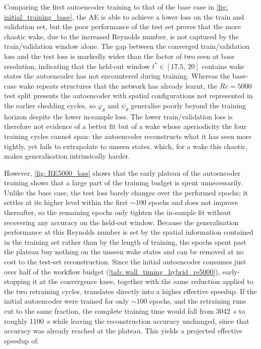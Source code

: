 Comparing the first autoencoder training to that of the base case in \autoref{fig: initial_training_base}, the AE is able to achieve a lower loss on the train and validation set, but the poor performance of the test set proves that the more chaotic wake, due to the increased Reynolds number, is not captured by the train/validation window alone. The gap between the converged train/validation loss and the test loss is markedly wider than the factor of two seen at base resolution, indicating that the held-out window $t^*\in[17.5,\,20]$ contains wake states the autoencoder has not encountered during training. Whereas the base-case wake repeats structures that the network has already learnt, the $Re=5000$ test split presents the autoencoder with spatial configurations not represented in the earlier shedding cycles, so $\varphi_\theta$ and $\psi_\theta$ generalise poorly beyond the training horizon despite the lower in-sample loss. The lower train/validation loss is therefore not evidence of a better fit but of a wake whose aperiodicity the four training cycles cannot span: the autoencoder reconstructs what it has seen more tightly, yet fails to extrapolate to unseen states, which, for a wake this chaotic, makes generalisation intrinsically harder.

However, \autoref{fig: RE5000_loss} shows that the early plateau of the autoencoder training shows that a large part of the training budget is spent unnecessarily. Unlike the base case, the test loss barely changes over the performed epochs; it settles at its higher level within the first $\sim\!100$ epochs and does not improve thereafter, so the remaining epochs only tighten the in-sample fit without recovering any accuracy on the held-out window. Because the generalisation performance at this Reynolds number is set by the spatial information contained in the training set rather than by the length of training, the epochs spent past the plateau buy nothing on the unseen wake states and can be removed at no cost to the test-set reconstruction. Since the initial autoencoder consumes just over half of the workflow budget (\autoref{tab: wall_timing_hybrid_re5000}), early-stopping it at the convergence knee, together with the same reduction applied to the two retraining cycles, translates directly into a higher effective speedup. If the initial autoencoder were trained for only $\sim\!100$ epochs, and the retraining runs cut to the same fraction, the complete training time would fall from \SI{3042}{\second} to roughly \SI{1100}{\second} while leaving the reconstruction accuracy unchanged, since that accuracy was already reached at the plateau. This yields a projected effective speedup of:

